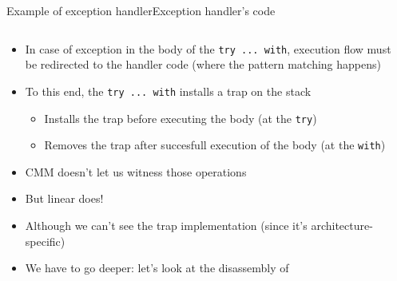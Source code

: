 \begin{frame}{Example of exception handler}{Exception handler's code}
\begin{columns}[c]
\begin{column}{0.5\textwidth}
\begin{itemize}
\item<1-> In case of exception in the body of the \texttt{try ... with}, execution flow must be redirected to the handler code (where the pattern matching happens)
\item<1-> To this end, the \texttt{try ... with} installs a trap on the stack
\begin{itemize}
\item<1-> Installs the trap before executing the body (at the \texttt{try})
\item<1-> Removes the trap after succesfull execution of the body (at the \texttt{with})
\end{itemize}
\item<2-> CMM doesn't let us witness those operations
\item<3-> But linear does!
\item<4-> Although we can't see the trap implementation (since it's architecture-specific)
\item<5-> We have to go deeper: let's look at the disassembly of 
\end{itemize}
\smallskip
{}
\end{column}
\begin{column}{0.5\textwidth}
%
%
%
%
\end{column}
\end{columns}
\end{frame}

